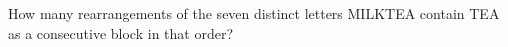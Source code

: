 How many rearrangements of the seven distinct letters MILKTEA contain TEA as a consecutive block in that order?
